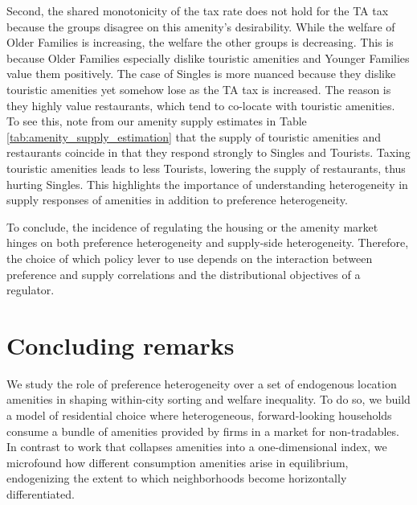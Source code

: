\documentclass[11pt]{article}
\begin{document}
Second, the shared monotonicity of the tax rate does not hold for the TA tax because the groups disagree on this amenity's desirability. While the welfare of Older Families is increasing, the welfare the other groups is decreasing. This is because Older Families especially dislike touristic amenities and Younger Families value them positively. The case of Singles is more nuanced because they dislike touristic amenities yet somehow lose as the TA tax is increased. The reason is they highly value restaurants, which tend to co-locate with touristic amenities. To see this, note from our amenity supply estimates in Table \ref{tab:amenity_supply_estimation} that the supply of touristic amenities and restaurants coincide in that they respond strongly to Singles and Tourists. Taxing touristic amenities leads to less Tourists, lowering the supply of restaurants, thus hurting Singles. This highlights the importance of understanding heterogeneity in supply responses of amenities in addition to preference heterogeneity.

To conclude, the incidence of regulating the housing or the amenity market hinges on both preference heterogeneity and supply-side heterogeneity. Therefore, the choice of which policy lever to use depends on the interaction between preference and supply correlations and the distributional objectives of a regulator.

\section{Concluding remarks}\label{sec: discussion}

We study the role of preference heterogeneity over a set of endogenous location amenities in shaping within-city sorting and welfare inequality. To do so, we build a model of residential choice where heterogeneous, forward-looking households consume a bundle of amenities provided by firms in a market for non-tradables. In contrast to work that collapses amenities into a one-dimensional index, we microfound how different consumption amenities arise in equilibrium, endogenizing the extent to which neighborhoods become horizontally differentiated.
\end{document}

